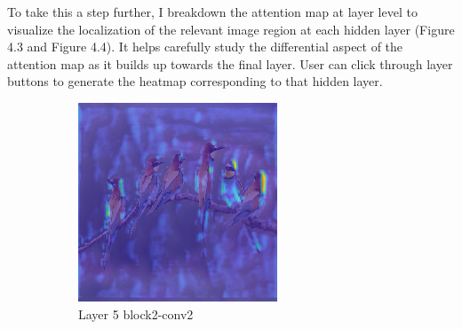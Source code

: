 To take this a step further, I breakdown the attention map at layer level to visualize the localization of the relevant image region at each hidden layer (Figure 4.3 and Figure 4.4). It helps carefully study the differential aspect of the attention map as it builds up towards the final layer. User can click through layer buttons to generate the heatmap corresponding to that hidden layer.

\begin{figure}
     \centering
     \caption{Layer-wise Relevance Heatmap}
     \begin{subfigure}[b]{0.30\textwidth}
         \centering
         \includegraphics[width=\textwidth]{images/hm-layer-5.png}
         \caption{Layer 5 block2-conv2}
         \label{fig:layer-5}
     \end{subfigure}
     \hspace{1em}%
     \begin{subfigure}[b]{0.30\textwidth}
         \centering

\end{subfigure}
\end{figure}
